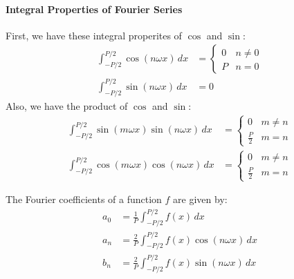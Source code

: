 \documentclass[11pt]{article}
\begin{document}
\paragraph{Integral Properties of Fourier Series} First, we have these integral properites of $\cos$ and $\sin$:
\begin{align}
    \int_{-P/2}^{P/2} \cos(n\omega x) \, dx &= \begin{cases}
        0 & n \ne 0 \\
        P & n = 0
    \end{cases} \\
    \int_{-P/2}^{P/2} \sin(n\omega x) \, dx &= 0
\end{align}
Also, we have the product of $\cos$ and $\sin$:
\begin{align}
    \int_{-P/2}^{P/2} \sin(m\omega x) \sin(n\omega x) \, dx &= \begin{cases}
        0 & m \ne n \\
        \frac{P}{2} & m = n
    \end{cases} \\ 
    \int_{-P/2}^{P/2} \cos(m\omega x) \cos(n\omega x) \, dx &= \begin{cases}
        0 & m \ne n \\
        \frac{P}{2} & m = n
    \end{cases} 
\end{align}
\begin{theorem}
    The Fourier coefficients of a function $f$ are given by:
    \begin{align}
        a_0 &= \frac{1}{P} \int_{-P/2}^{P/2} f(x) \, dx \\
        a_n &= \frac{2}{P} \int_{-P/2}^{P/2} f(x) \cos(n\omega x) \, dx \\
        b_n &= \frac{2}{P} \int_{-P/2}^{P/2} f(x) \sin(n\omega x) \, dx
    \end{align}
\end{theorem}
\appendix

\end{document}
